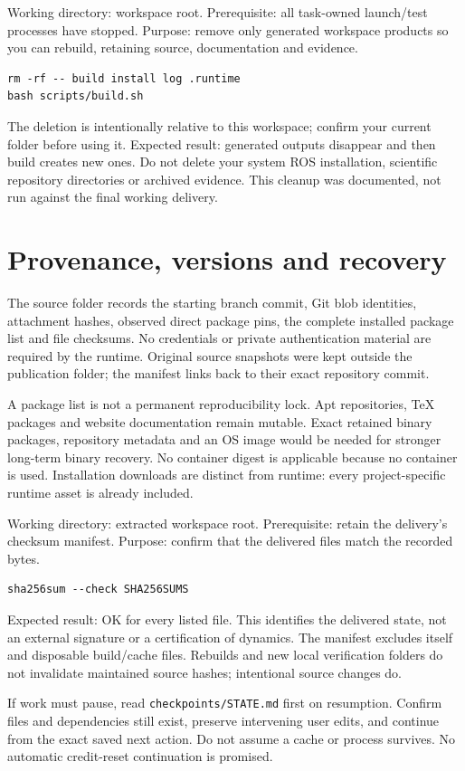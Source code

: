 Working directory: workspace root. Prerequisite: all task-owned launch/test processes have stopped. Purpose: remove only generated workspace products so you can rebuild, retaining source, documentation and evidence.
\begin{lstlisting}
rm -rf -- build install log .runtime
bash scripts/build.sh
\end{lstlisting}
The deletion is intentionally relative to this workspace; confirm your current folder before using it. Expected result: generated outputs disappear and then build creates new ones. Do not delete your system ROS installation, scientific repository directories or archived evidence. This cleanup was documented, not run against the final working delivery.

\section{Provenance, versions and recovery}
The source folder records the starting branch commit, Git blob identities, attachment hashes, observed direct package pins, the complete installed package list and file checksums. No credentials or private authentication material are required by the runtime. Original source snapshots were kept outside the publication folder; the manifest links back to their exact repository commit.

A package list is not a permanent reproducibility lock. Apt repositories, TeX packages and website documentation remain mutable. Exact retained binary packages, repository metadata and an OS image would be needed for stronger long-term binary recovery. No container digest is applicable because no container is used. Installation downloads are distinct from runtime: every project-specific runtime asset is already included.

Working directory: extracted workspace root. Prerequisite: retain the delivery's checksum manifest. Purpose: confirm that the delivered files match the recorded bytes.
\begin{lstlisting}
sha256sum --check SHA256SUMS
\end{lstlisting}
Expected result: OK for every listed file. This identifies the delivered state, not an external signature or a certification of dynamics. The manifest excludes itself and disposable build/cache files. Rebuilds and new local verification folders do not invalidate maintained source hashes; intentional source changes do.

If work must pause, read \texttt{checkpoints/STATE.md} first on resumption. Confirm files and dependencies still exist, preserve intervening user edits, and continue from the exact saved next action. Do not assume a cache or process survives. No automatic credit-reset continuation is promised.


